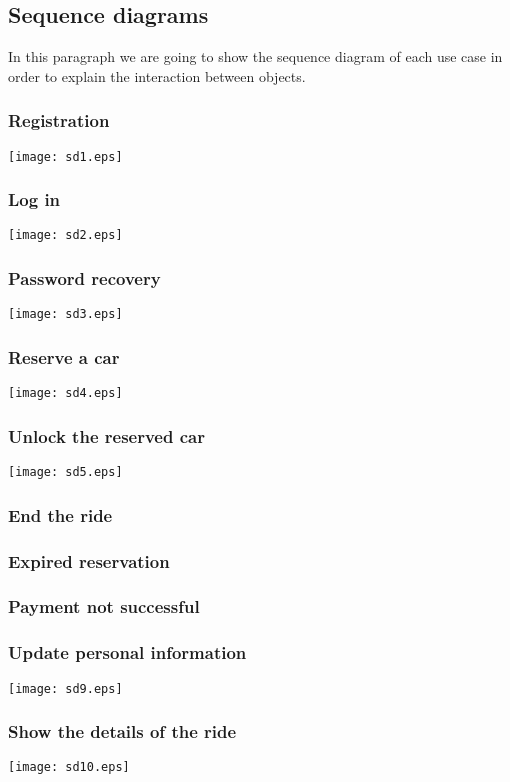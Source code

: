 \pagebreak
\subsection{Sequence diagrams}
In this paragraph we are going to show the sequence diagram of each use case in order to explain the interaction between objects.

\subsubsection{Registration}
	\centerline{
		\texttt{[image: sd1.eps]}}
	\pagebreak

\subsubsection{Log in}
	\centerline{
		\texttt{[image: sd2.eps]}}
	\pagebreak

\subsubsection{Password recovery}
	\centerline{
		\texttt{[image: sd3.eps]}}
	\pagebreak
	
\subsubsection{Reserve a car}
	\centerline{
		\texttt{[image: sd4.eps]}}
	\pagebreak
	
\subsubsection{Unlock the reserved car}
	\centerline{
		\texttt{[image: sd5.eps]}}
		\pagebreak

\subsubsection{End the ride}

\subsubsection{Expired reservation}
	
\subsubsection{Payment not successful}
	\pagebreak
	
\subsubsection{Update personal information}
	\centerline{
		\texttt{[image: sd9.eps]}}
	\pagebreak
	
\subsubsection{Show the details of the ride}
	\centerline{
		\texttt{[image: sd10.eps]}}